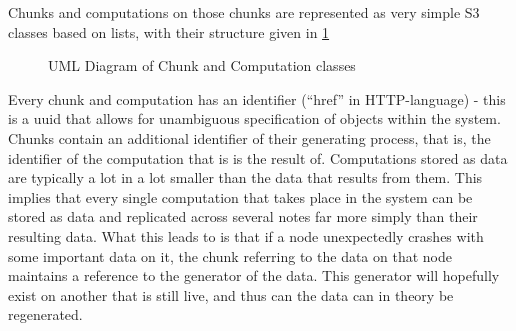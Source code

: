 Chunks and computations on those chunks are represented as very simple S3 classes based on lists, with their structure given in \cref{fig:largerscale}

\begin{figure}

\caption{UML Diagram of Chunk and Computation classes}
\label{fig:largerscale}
\end{figure}

Every chunk and computation has an identifier (``href'' in HTTP-language) - this is a uuid that allows for unambiguous specification of objects within the system.
Chunks contain an additional identifier of their generating process, that is, the identifier of the computation that is is the result of.
Computations stored as data are typically a lot in a lot smaller than the data that results from them.
This implies that every single computation that takes place in the system can be stored as data and replicated across several notes far more simply than their resulting data.
What this leads to is that if a node unexpectedly crashes with some important data on it, the chunk referring to the data on that node maintains a reference to the generator of the data.
This generator will hopefully exist on another that is still live, and thus can the data can in theory be regenerated.
